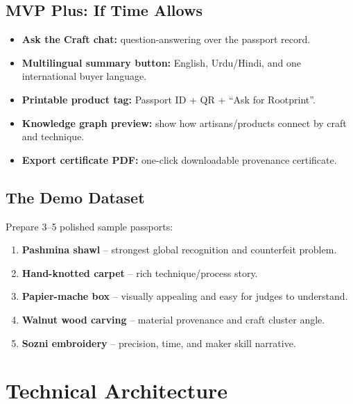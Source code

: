 \documentclass[11pt,a4paper]{article}
\begin{document}
\subsection{MVP Plus: If Time Allows}

\begin{itemize}
  \item \textbf{Ask the Craft chat:} question-answering over the passport record.
  \item \textbf{Multilingual summary button:} English, Urdu/Hindi, and one international buyer language.
  \item \textbf{Printable product tag:} Passport ID + QR + ``Ask for Rootprint''.
  \item \textbf{Knowledge graph preview:} show how artisans/products connect by craft and technique.
  \item \textbf{Export certificate PDF:} one-click downloadable provenance certificate.
\end{itemize}

\subsection{The Demo Dataset}

Prepare 3--5 polished sample passports:

\begin{enumerate}
  \item \textbf{Pashmina shawl} -- strongest global recognition and counterfeit problem.
  \item \textbf{Hand-knotted carpet} -- rich technique/process story.
  \item \textbf{Papier-mache box} -- visually appealing and easy for judges to understand.
  \item \textbf{Walnut wood carving} -- material provenance and craft cluster angle.
  \item \textbf{Sozni embroidery} -- precision, time, and maker skill narrative.
\end{enumerate}

\section{Technical Architecture}
\end{document}
